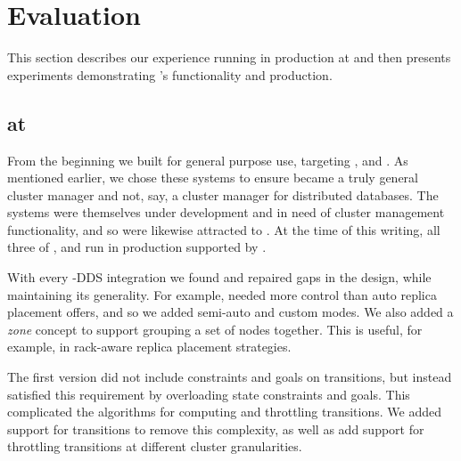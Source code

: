 \section{Evaluation}
\label{sec:eval}
%
This section describes our experience running \helix in production at \linkedin and
then presents experiments demonstrating \helix's functionality and production.

\subsection{\helix at \linkedin}
\label{sec:production}
%
From the beginning we built \helix for general purpose use, targeting \ES, \seas
and \databus.  As mentioned earlier, we chose these systems
to ensure \helix became a truly general cluster manager and not, say, a
cluster manager for distributed databases. 
The systems were themselves under development and in need of cluster management
functionality, and so were likewise attracted to \helix.
At the time of this writing, all three of \ES, \seas and \databus run in
production supported by \helix.

With every \helix-DDS integration we found and repaired gaps in the \helix
design, while maintaining its generality.  For example, \seas needed more
control than auto replica placement offers, and so we added semi-auto and
custom modes.
We also added a \emph{zone} concept to support grouping a set of
nodes together.  This is useful, for example, in rack-aware replica placement
strategies.  

The first \helix version did not include constraints and goals on transitions, but instead
satisfied this requirement by overloading state constraints and goals.  This complicated
the algorithms for computing and throttling transitions.  We added support for
transitions to remove this complexity, as well as add support for throttling
transitions at different cluster granularities.


